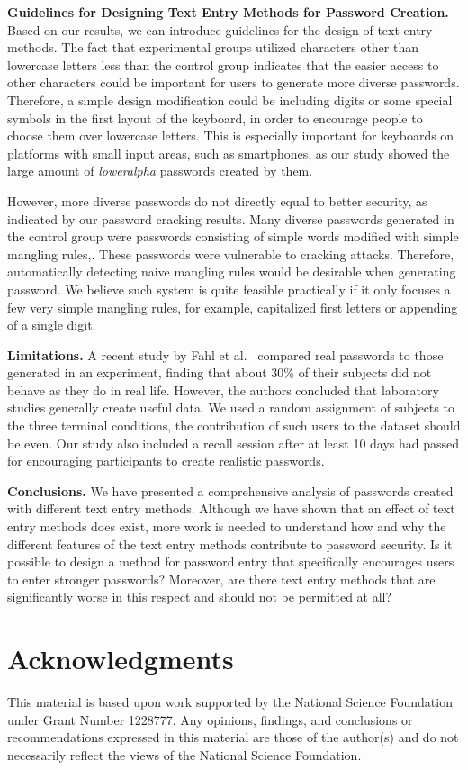\documentclass[conference]{IEEEtran}
\begin{document}
\textbf{Guidelines for Designing Text Entry Methods for Password Creation.} Based on our results, we can introduce guidelines for the design of text entry methods. The fact that experimental groups utilized characters other than lowercase letters less than the control group indicates that the easier access to other characters could be important for users to generate more diverse passwords. Therefore, a simple design modification could be including digits or some special symbols in the first layout of the keyboard, in order to encourage people to choose them over lowercase letters. This is especially important for keyboards on platforms with small input areas, such as smartphones, as our study showed the large amount of \emph{loweralpha} passwords created by them.

However, more diverse passwords do not directly equal to better security, as indicated by our password cracking results. Many diverse passwords generated in the control group were passwords consisting of simple words modified with simple mangling rules,. These passwords were vulnerable to cracking attacks. Therefore, automatically detecting naive mangling rules would be desirable when generating password. We believe such system is quite feasible practically if it only focuses a few very simple mangling rules, for example, capitalized first letters or appending of a single digit.


\textbf{Limitations.} A recent study by Fahl et al.~\cite{Fahl:2013:EVP:2501604.2501617} compared real passwords to those generated in an experiment, finding that about 30\% of their subjects did not behave as they do in real life. However, the authors concluded that laboratory studies generally create useful data. We used a random assignment of subjects to the three terminal conditions, the contribution of such users to the dataset should be even. Our study also included a recall session after at least 10 days had passed for encouraging participants to create realistic passwords.

\textbf{Conclusions.} 
We have presented a comprehensive analysis of passwords created with different text entry methods.
Although we have shown that an effect of text entry methods does exist, more work is needed to understand how and why the different features of the text entry methods contribute to password security. Is it possible to design a method for password entry that specifically encourages users to enter stronger passwords? Moreover, are there text entry methods that are significantly worse in this respect and should not be permitted at all?

\section*{Acknowledgments}

This material is based upon work supported by the National Science Foundation under Grant Number 1228777. Any opinions, findings, and conclusions or recommendations expressed in this material are those of the author(s) and do not necessarily reflect the views of the National Science Foundation.


\balance


\end{document}
